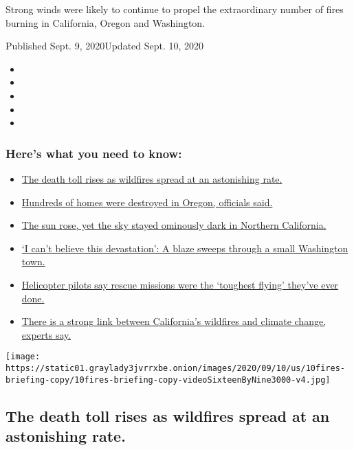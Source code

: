 Strong winds were likely to continue to propel the extraordinary number
of fires burning in California, Oregon and Washington.

Published Sept. 9, 2020Updated Sept. 10, 2020

\begin{itemize}
\item
\item
\item
\item
\item
\end{itemize}

\hypertarget{heres-what-you-need-to-know}{%
\subsubsection{Here's what you need to
know:}\label{heres-what-you-need-to-know}}

\begin{itemize}
\tightlist
\item
  \protect\hyperlink{link-1a2d0777}{The death toll rises as wildfires
  spread at an astonishing rate.}
\item
  \protect\hyperlink{link-6e18e4e0}{Hundreds of homes were destroyed in
  Oregon, officials said.}
\item
  \protect\hyperlink{link-2a88e094}{The sun rose, yet the sky stayed
  ominously dark in Northern California.}
\item
  \protect\hyperlink{link-150005eb}{`I can't believe this devastation':
  A blaze sweeps through a small Washington town.}
\item
  \protect\hyperlink{link-64853c8a}{Helicopter pilots say rescue
  missions were the `toughest flying' they've ever done.}
\item
  \protect\hyperlink{link-27c03528}{There is a strong link between
  California's wildfires and climate change, experts say.}
\end{itemize}

\texttt{[image: https://static01.graylady3jvrrxbe.onion/images/2020/09/10/us/10fires-briefing-copy/10fires-briefing-copy-videoSixteenByNine3000-v4.jpg]}

\hypertarget{the-death-toll-rises-as-wildfires-spread-at-an-astonishing-rate}{%
\subsection{The death toll rises as wildfires spread at an astonishing
rate.}\label{the-death-toll-rises-as-wildfires-spread-at-an-astonishing-rate}}

